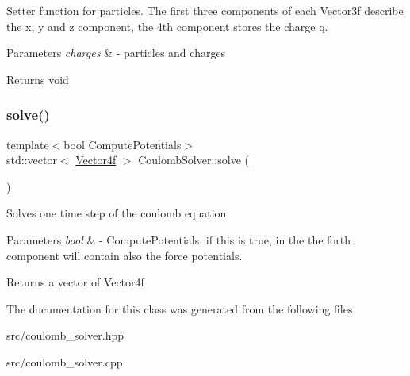 Setter function for particles. The first three components of each Vector3f describe the x, y and z component, the 4\textquotesingle{}th component stores the charge q. 
\begin{DoxyParams}{Parameters}
{\em charges} & -\/ particles and charges \\
\hline
\end{DoxyParams}
\begin{DoxyReturn}{Returns}
void 
\end{DoxyReturn}
\mbox{\label{classCoulombSolver_a5a0cbb3931a1b1939673b9ee918a4300}} 
\subsubsection{\texorpdfstring{solve()}{solve()}}
{\footnotesize\ttfamily template$<$bool Compute\+Potentials$>$ \\
std\+::vector$<$ \hyperlink{structVector}{Vector4f} $>$ Coulomb\+Solver\+::solve (\begin{DoxyParamCaption}{ }\end{DoxyParamCaption})}

Solves one time step of the coulomb equation. 
\begin{DoxyParams}{Parameters}
{\em bool} & -\/ Compute\+Potentials, if this is true, in the the forth component will contain also the force potentials. \\
\hline
\end{DoxyParams}
\begin{DoxyReturn}{Returns}
a vector of Vector4f 
\end{DoxyReturn}


The documentation for this class was generated from the following files\+:\begin{DoxyCompactItemize}
\item 
src/coulomb\+\_\+solver.\+hpp\item 
src/coulomb\+\_\+solver.\+cpp\end{DoxyCompactItemize}
